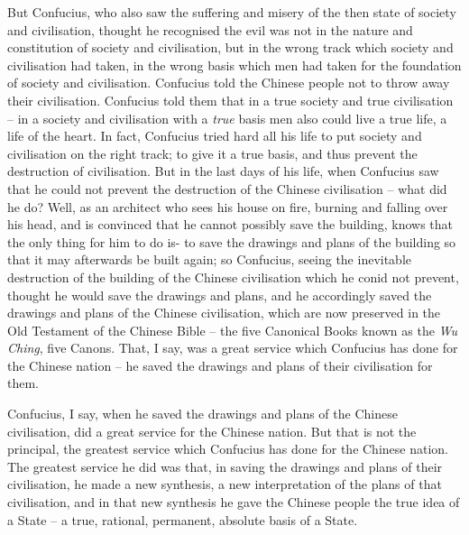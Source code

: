 But Confucius, who also saw the suffering and misery of the then state of society and civilisation, thought he recognised the evil was not in the nature and constitution of society and civilisation, but in the wrong track which society and civilisation had taken, in the wrong basis which men had taken for the foundation of society and civilisation. Confucius told the Chinese people not to throw away their civilisation. Confucius told them that in a true society and true civilisation -- in a society and civilisation with a \emph{true} basis men also could live a true life, a life of the heart. In fact, Confucius tried hard all his life to put society and civilisation on the right track; to give it a true basis, and thus prevent the destruction of civilisation. But in the last days of his life, when Confucius saw that he could not prevent the destruction of the Chinese civilisation -- what did he do? Well, as an architect who sees his house on fire, burning and falling over his head, and is convinced that he cannot possibly save the building, knows that the only thing for him to do is- to save the drawings and plans of the building so that it may afterwards be built again; so Confucius, seeing the inevitable destruction of the building of the Chinese civilisation which he conid not prevent, thought he would save the drawings and plans, and he accordingly saved the drawings and plans of the Chinese civilisation, which are now preserved in the Old Testament of the Chinese Bible -- the five Canonical Books known as the \emph{Wu Ching}, five Canons. That, I say, was a great service which Confucius has done for the Chinese nation -- he saved the drawings and plans of their civilisation for them.

Confucius, I say, when he saved the drawings and plans of the Chinese civilisation, did a great service for the Chinese nation. But that is not the principal, the greatest service which Confucius has done for the Chinese nation. The greatest service he did was that, in saving the drawings and plans of their civilisation, he made a new synthesis, a new interpretation of the plans of that civilisation, and in that new synthesis he gave the Chinese people the true idea of a State -- a true, rational, permanent, absolute basis of a State.

